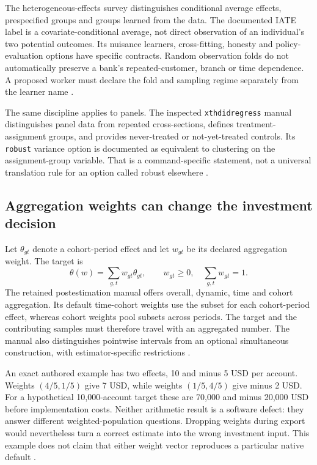 The heterogeneous-effects survey distinguishes conditional average effects,
prespecified groups and groups learned from the data. The documented IATE
label is a covariate-conditional average, not direct observation of an
individual's two potential outcomes. Its nuisance learners, cross-fitting,
honesty and policy-evaluation options have specific contracts. Random
observation folds do not automatically preserve a bank's repeated-customer,
branch or time dependence. A proposed worker must declare the fold and
sampling regime separately from the learner name
\cite{exec13_ch_stata,exec24_stata_choice}.

The same discipline applies to panels. The inspected
\texttt{xthdidregress} manual distinguishes panel data from repeated
cross-sections, defines treatment-assignment groups, and provides
never-treated or not-yet-treated controls. Its \texttt{robust} variance
option is documented as equivalent to clustering on the assignment-group
variable. That is a command-specific statement, not a universal translation
rule for an option called robust elsewhere
\cite{exec18_gp_stata_xthdid}.

\subsection{Aggregation weights can change the investment decision}
Let $\theta_{gt}$ denote a cohort-period effect and let $w_{gt}$ be its
declared aggregation weight. The target is
\[
 \theta(w)=\sum_{g,t} w_{gt}\theta_{gt},\qquad
 w_{gt}\geq0,\quad\sum_{g,t}w_{gt}=1.
\]
The retained postestimation manual offers overall, dynamic, time and cohort
aggregation. Its default time-cohort weights use the subset for each
cohort-period effect, whereas cohort weights pool subsets across periods.
The target and the contributing samples must therefore travel with an
aggregated number. The manual also distinguishes pointwise intervals from
an optional simultaneous construction, with estimator-specific restrictions
\cite{exec18_gp_stata_post}.

An exact authored example has two effects, 10 and minus 5 USD per account.
Weights $(4/5,1/5)$ give 7 USD, while weights $(1/5,4/5)$ give minus
2 USD. For a hypothetical 10,000-account target these are 70,000 and minus
20,000 USD before implementation costs. Neither arithmetic result is a
software defect: they answer different weighted-population questions.
Dropping weights during export would nevertheless turn a correct estimate
into the wrong investment input. This example does not claim that either
weight vector reproduces a particular native default
\cite{exec24_stata_choice}.

